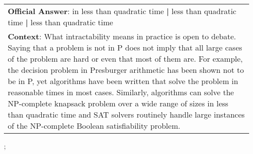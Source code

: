 \begin{figure*}[ht]
{\begin{tabular}{p{}}
            \textbf{Official Answer}: in less than quadratic time \textbf{|} less than quadratic time \textbf{|} less than quadratic time                                                                                                                                                                                                                                                                                                                                                                                                                                                                                            \\
            \textbf{Context}: What intractability means in practice is open to debate. Saying that a problem is not in P does not imply that all large cases of the problem are hard or even that most of them are. For example, the decision problem in Presburger arithmetic has been shown not to be in P, yet algorithms have been written that solve the problem in reasonable times in most cases. Similarly, algorithms can solve the NP-complete knapsack problem over a wide range of sizes in less than quadratic time and SAT solvers routinely handle large instances of the NP-complete Boolean satisfiability problem. \\
        \end{tabular}
    };
    \label{fig:ex-56e1febfe3433e1400423239}
\end{figure*}

